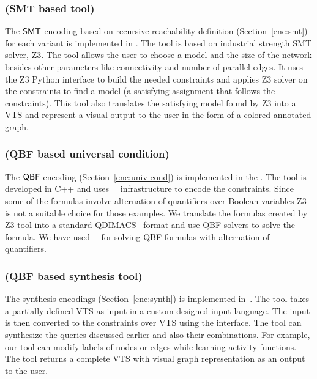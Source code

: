 \subsubsection{{\smttool} (SMT based tool)}
The $\mathsf{SMT}$ encoding based on recursive reachability definition (Section~\ref{enc:smt})  for each variant is implemented in {\smttool}.
%
The tool is based on industrial strength SMT solver, Z3. 
%
The tool allows the user to choose a model and the size
of the network besides other parameters like connectivity and number of parallel edges. 
%        
It uses the Z3 Python interface to build the needed constraints and applies Z3 solver on the constraints to find a model (a satisfying assignment that follows the constraints). 
%
This tool also translates the satisfying model found by Z3 into
a VTS and represent a visual output to the user in the form of a colored annotated graph. 
%
%
 

\subsubsection{{\qbftool} (QBF based universal condition)}
The $\mathsf{QBF}$ encoding (Section~\ref{enc:univ-cond}) is implemented in the {\qbftool}. 
%
The tool is developed in C++ and uses~\zthree~\cite{z3} infrastructure to encode the constraints.
%
Since some of the formulas involve alternation of quantifiers over Boolean variables Z3 is not a suitable choice for those examples.
%
We translate the formulas created by Z3 tool into a standard
QDIMACS~\cite{qdimacs} format and use QBF solvers to solve the formula. 
%
We have used~\depqbf~\cite{lonsing2010depqbf} for solving QBF formulas with alternation of quantifiers. 

\subsubsection{{\ourtool} (QBF based synthesis tool)}
The synthesis encodings (Section~\ref{enc:synth}) is implemented  in~\ourtool.
%
The tool takes a partially defined VTS as input in a custom designed
input language.
%
The input is then converted to the constraints over VTS using the {\qbftool} interface. 
%
The tool can synthesize the queries discussed earlier and also their combinations.
%
For example, our tool can modify labels of nodes or edges while
learning activity functions.
%
The tool returns a complete VTS with visual graph representation as an output to the user.  

